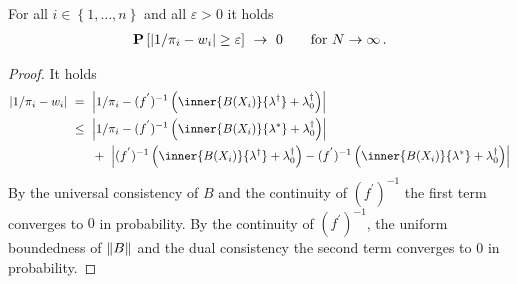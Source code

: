 \begin{theorem}
  \label{bw:cp:th}
  For all
  $i\in \left\{ 1,\ldots,n \right\}$
  and all
  $\varepsilon>0$ it holds
  \begin{gather}
    \P
    \left[ 
   \left| 
   1 / \pi_i
   -
   w_i
   \right|
    \ge
    \varepsilon
    \right]
    \ 
    \to
    \ 
    0
    \qquad
    \text{for}\ 
    N
    \to 
    \infty
    \,.
  \end{gather}
\end{theorem}

\begin{proof}
  It holds
 \begin{align*}
   \left| 
   1 / \pi_i
   -
   w_i
   \right|
   & 
   \ 
   =
   \ 
   \left| 
   1 / \pi_i
   -
   (
      f ^ { ' }
   )
   ^ {-1}
   \left( 
   \inner
   { B(X_i)}
   { \lambda ^ \dagger }
   +
   \lambda^\dagger_0
   \right)
   \right|
   \\
   & 
   \ 
   \le
   \ 
   \left| 
   1 / \pi_i
   -
   (
      f ^ { ' }
   )
   ^ {-1}
   \left( 
   \inner
   { B(X_i)}
   { \lambda ^ * }
   +
   \lambda^\dagger_0
   \right)
   \right|
   \\
   &
   \qquad
   +
   \ 
\left| 
   (
      f ^ { ' }
   )
   ^ {-1}
   \left( 
   \inner
   { B(X_i)}
   { \lambda ^ \dagger }
   +
   \lambda^\dagger_0
   \right)
   -
   (
      f ^ { ' }
   )
   ^ {-1}
   \left( 
   \inner
   { B(X_i)}
   { \lambda ^ *}
   +
   \lambda^\dagger_0
   \right)
   \right|
 \end{align*}
 By the universal consistency of $B$ and the continuity of $(f^{'})^{-1}$ the first term converges to $0$ in probability.
 By the continuity of $(f^{'})^{-1}$,
 the uniform boundedness of $\left\lVert B\right\rVert$ and the dual consistency
 the second term converges to $0$ in probability.

\end{proof}
